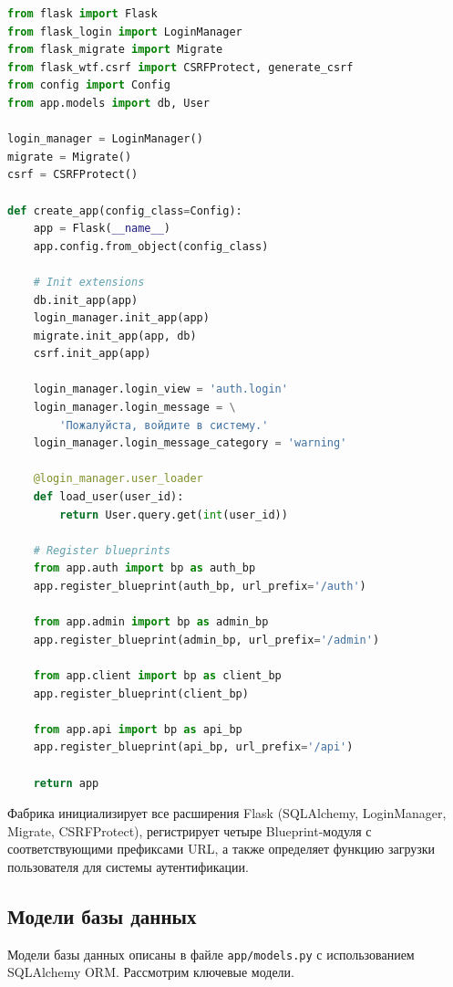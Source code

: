 \documentclass[14pt,a4paper,oneside]{extarticle}
\begin{document}
\begin{lstlisting}[language=Python, caption={Фабрика приложения (app/\_\_init\_\_.py)}, label={lst:factory}]
from flask import Flask
from flask_login import LoginManager
from flask_migrate import Migrate
from flask_wtf.csrf import CSRFProtect, generate_csrf
from config import Config
from app.models import db, User

login_manager = LoginManager()
migrate = Migrate()
csrf = CSRFProtect()

def create_app(config_class=Config):
    app = Flask(__name__)
    app.config.from_object(config_class)

    # Init extensions
    db.init_app(app)
    login_manager.init_app(app)
    migrate.init_app(app, db)
    csrf.init_app(app)

    login_manager.login_view = 'auth.login'
    login_manager.login_message = \
        'Пожалуйста, войдите в систему.'
    login_manager.login_message_category = 'warning'

    @login_manager.user_loader
    def load_user(user_id):
        return User.query.get(int(user_id))

    # Register blueprints
    from app.auth import bp as auth_bp
    app.register_blueprint(auth_bp, url_prefix='/auth')

    from app.admin import bp as admin_bp
    app.register_blueprint(admin_bp, url_prefix='/admin')

    from app.client import bp as client_bp
    app.register_blueprint(client_bp)

    from app.api import bp as api_bp
    app.register_blueprint(api_bp, url_prefix='/api')

    return app
\end{lstlisting}

Фабрика инициализирует все расширения Flask (SQLAlchemy, LoginManager, Migrate, CSRFProtect), регистрирует четыре Blueprint-модуля с соответствующими префиксами URL, а также определяет функцию загрузки пользователя для системы аутентификации.

\subsection{Модели базы данных}

Модели базы данных описаны в файле \texttt{app/models.py} с использованием SQLAlchemy ORM. Рассмотрим ключевые модели.
\end{document}
